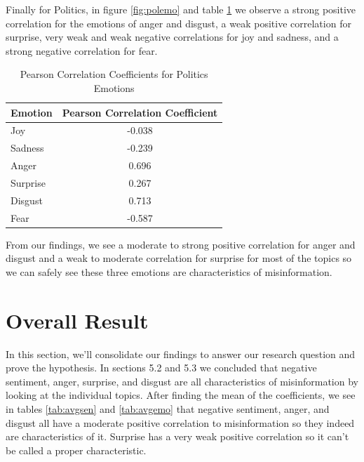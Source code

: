 \documentclass{l4proj}
\begin{document}
Finally for Politics, in figure \ref{fig:polemo} and table \ref{tab:polemo} we observe a strong positive correlation for the emotions of anger and disgust, a weak positive correlation for surprise, very weak and weak negative correlations for joy and sadness, and a strong negative correlation for fear.

\begin{table}[H]
\begin{minipage}[c]{\linewidth}
\centering
\begin{tabular}{@{}lc@{}}
\toprule
Emotion  & \multicolumn{1}{l}{Pearson Correlation Coefficient} \\ \midrule
Joy      & -0.038                                              \\
Sadness  & -0.239                                              \\
Anger    & 0.696                                               \\
Surprise & 0.267                                               \\
Disgust  & 0.713                                               \\
Fear     & -0.587                                              \\ \bottomrule
\end{tabular}
\caption{Pearson Correlation Coefficients for Politics Emotions}
\label{tab:polemo}
\end{minipage}\hfill

\end{table}

From our findings, we see a moderate to strong positive correlation for anger and disgust and a weak to moderate correlation for surprise for most of the topics so we can safely see these three emotions are characteristics of misinformation.

\section{Overall Result}
In this section, we'll consolidate our findings to answer our research question and prove the hypothesis. In sections 5.2 and 5.3 we concluded that negative sentiment, anger, surprise, and disgust are all characteristics of misinformation by looking at the individual topics. After finding the mean of the coefficients, we see in tables \ref{tab:avgsen} and \ref{tab:avgemo} that negative sentiment, anger, and disgust all have a moderate positive correlation to misinformation so they indeed are characteristics of it. Surprise has a very weak positive correlation so it can't be called a proper characteristic. 
\end{document}
